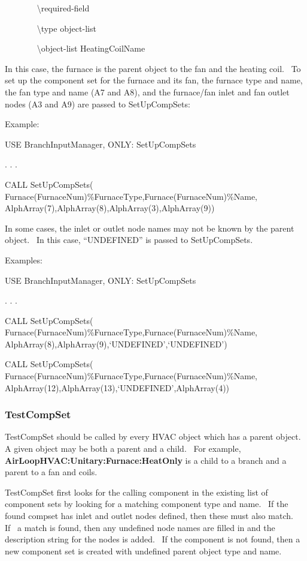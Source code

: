 ~~~~~~~ \textbackslash{}required-field

~~~~~~~ \textbackslash{}type object-list

~~~~~~~ \textbackslash{}object-list HeatingCoilName

In this case, the furnace is the parent object to the fan and the heating coil.~ To set up the component set for the furnace and its fan, the furnace type and name, the fan type and name (A7 and A8), and the furnace/fan inlet and fan outlet nodes (A3 and A9) are passed to SetUpCompSets:

Example:

USE BranchInputManager, ONLY: SetUpCompSets

. . .

CALL SetUpCompSets( Furnace(FurnaceNum)\%FurnaceType,Furnace(FurnaceNum)\%Name, AlphArray(7),AlphArray(8),AlphArray(3),AlphArray(9))

In some cases, the inlet or outlet node names may not be known by the parent object.~ In this case, ``UNDEFINED'' is passed to SetUpCompSets.

Examples:

USE BranchInputManager, ONLY: SetUpCompSets

. . .

CALL SetUpCompSets( Furnace(FurnaceNum)\%FurnaceType,Furnace(FurnaceNum)\%Name, AlphArray(8),AlphArray(9),`UNDEFINED',`UNDEFINED')

CALL SetUpCompSets( Furnace(FurnaceNum)\%FurnaceType,Furnace(FurnaceNum)\%Name, AlphArray(12),AlphArray(13),`UNDEFINED',AlphArray(4))

\subsubsection{TestCompSet}\label{testcompset}

TestCompSet should be called by every HVAC object which has a parent object.~ A given object may be both a parent and a child.~ For example, \textbf{AirLoopHVAC:Unitary:Furnace:HeatOnly} is a child to a branch and a parent to a fan and coils.

TestCompSet first looks for the calling component in the existing list of component sets by looking for a matching component type and name.~ If the found compset has inlet and outlet nodes defined, then these must also match.~ If~ a match is found, then any undefined node names are filled in and the description string for the nodes is added.~ If the component is not found, then a new component set is created with undefined parent object type and name.

